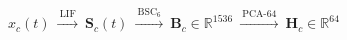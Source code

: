\documentclass[border=10pt]{standalone}
\newcommand{\eqcol}{\color{sbnavy}}
\begin{document}
{\fontsize{26}{32}\selectfont \eqcol $\displaystyle x_c(t)\ \xrightarrow{\ \text{LIF}\ }\ \mathbf{S}_c(t)\ \xrightarrow{\ \text{BSC}_6\ }\ \mathbf{B}_c\in\mathbb{R}^{1536}\ \xrightarrow{\ \text{PCA-64}\ }\ \mathbf{H}_c\in\mathbb{R}^{64}$}
\end{document}
